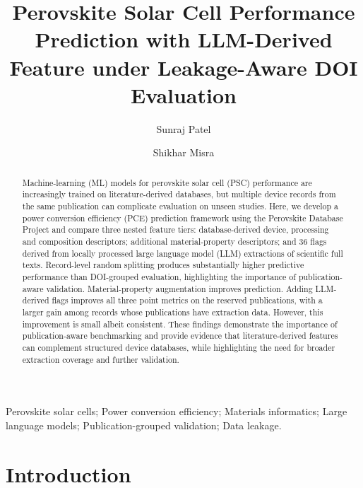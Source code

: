 \documentclass[3p]{elsarticle}
\begin{document}
\begin{frontmatter}

    \title{Perovskite Solar Cell Performance Prediction with LLM-Derived Feature under Leakage-Aware DOI Evaluation}

    \author[1]{Sunraj Patel}
    \author[1]{Shikhar Misra}


    \address[1]{Department of Materials Science and Engineering, Indian Institute of Technology Kanpur, India 208016}


    \begin{abstract}
        Machine-learning (ML) models for perovskite solar cell (PSC) performance are increasingly trained on literature-derived databases, but multiple device records from the same publication can complicate evaluation on unseen studies. Here, we develop a power conversion efficiency (PCE) prediction framework using the Perovskite Database Project and compare three nested feature tiers: database-derived device, processing and composition descriptors; additional material-property descriptors; and 36 flags derived from locally processed large language model (LLM) extractions of scientific full texts. Record-level random splitting produces substantially higher predictive performance than DOI-grouped evaluation, highlighting the importance of publication-aware validation. Material-property augmentation improves prediction. Adding LLM-derived flags improves all three point metrics on the reserved publications, with a larger gain among records whose publications have extraction data. However, this improvement is small albeit consistent. These findings demonstrate the importance of publication-aware benchmarking and provide evidence that literature-derived features can complement structured device databases, while highlighting the need for broader extraction coverage and further validation.
    \end{abstract}

    \begin{keyword}
        Perovskite solar cells; Power conversion efficiency; Materials informatics; Large language models; Publication-grouped validation; Data leakage.
    \end{keyword}

\end{frontmatter}

\section{Introduction}
\end{document}
